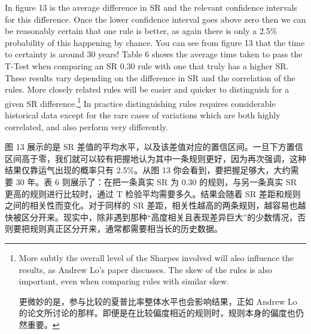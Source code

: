 \begin{englishblock} In figure 13 is the average difference in SR and the relevant confidence intervals for this difference. Once the lower confidence interval goes above zero then we can be reasonably certain that one rule is better, as again there is only a 2.5\% probability of this happening by chance. You can see from figure 13 that the time to certainty is around 30 years! Table 6 shows the average time taken to pass the T-Test when comparing an SR 0.30 rule with one that truly has a higher SR. These results vary depending on the difference in SR and the correlation of the rules. More closely related rules will be easier and quicker to distinguish for a given SR difference.\footnote{More subtly the overall level of the Sharpes involved will also influence the results, as Andrew Lo's paper discusses. The skew of the rules is also important, even when comparing rules with similar skew. \par 更微妙的是，参与比较的夏普比率整体水平也会影响结果，正如 Andrew Lo 的论文所讨论的那样。即便是在比较偏度相近的规则时，规则本身的偏度也仍然重要。} In practice distinguishing rules requires considerable historical data except for the rare cases of variations which are both highly correlated, and also perform very differently. \end{englishblock}

\begin{chineseblock}图 13 展示的是 SR 差值的平均水平，以及该差值对应的置信区间。一旦下方置信区间高于零，我们就可以较有把握地认为其中一条规则更好，因为再次强调，这种结果仅靠运气出现的概率只有 2.5\%。从图 13 你会看到，要把握足够大，大约需要 30 年。表 6 则展示了：在把一条真实 SR 为 0.30 的规则，与另一条真实 SR 更高的规则进行比较时，通过 T 检验平均需要多久。结果会随着 SR 差距和规则之间的相关性而变化。对于同样的 SR 差距，相关性越高的两条规则，越容易也越快被区分开来。现实中，除非遇到那种“高度相关且表现差异巨大”的少数情况，否则要把规则真正区分开来，通常都需要相当长的历史数据。\end{chineseblock}

